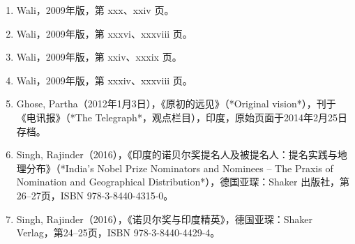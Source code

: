 \begin{enumerate}
\item Wali，2009年版，第 xxx、xxiv 页。
\item Wali，2009年版，第 xxxvi、xxxviii 页。
\item Wali，2009年版，第 xxiv、xxxix 页。
\item Wali，2009年版，第 xxxiv、xxxviii 页。
\item Ghose, Partha（2012年1月3日），《原初的远见》（*Original vision*），刊于《电讯报》（*The Telegraph*，观点栏目），印度，原始页面于2014年2月25日存档。
\item Singh, Rajinder（2016），《印度的诺贝尔奖提名人及被提名人：提名实践与地理分布》（*India's Nobel Prize Nominators and Nominees – The Praxis of Nomination and Geographical Distribution*），德国亚琛：Shaker 出版社，第26–27页，ISBN 978-3-8440-4315-0。
\item Singh, Rajinder（2016），《诺贝尔奖与印度精英》，德国亚琛：Shaker Verlag，第24–25页，ISBN 978-3-8440-4429-4。

\end{enumerate}